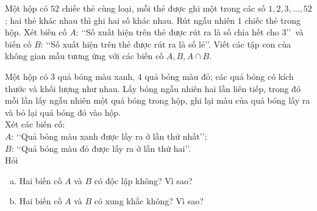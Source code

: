 \begin{bt}%
	Một hộp có $52$ chiếc thẻ cùng loại, mỗi thẻ được ghi một trong các số $1,2,3, \ldots, 52$; hai thẻ khác nhau thì ghi hai số khác nhau. Rút ngẫu nhiên $1$ chiếc thẻ trong hộp. Xét biến cố $A$: \lq\lq Số xuất hiện trên thẻ được rút ra là số chia hết cho 3\rq\rq \, và biến cố $B$: \lq\lq Số xuất hiện trên thẻ được rút ra là số lẻ\rq\rq. Viết các tập con của không gian mẫu tương ứng với các biến cố $A, B, A \cap B$.
\end{bt}

\begin{bt}%
	Một hộp có $3$ quả bóng màu xanh, $4$ quả bóng màu đỏ; các quả bóng có kích thước và khối lượng như nhau. Lấy bóng ngẫu nhiên hai lần liên tiếp, trong đó mỗi lần lấy ngẫu nhiên một quả bóng trong hộp, ghi lại màu của quả bóng lấy ra và bỏ lại quả bóng đó vào hộp.\\
	Xét các biến cố:\\
	$A$: \lq\lq Quả bóng màu xanh được lấy ra ở lần thứ nhất\rq\rq;\\
	$B$: \lq\lq Quả bóng màu đỏ được lấy ra ở lần thứ hai\rq\rq.\\
	Hỏi
	\begin{enumerate}[a)]
		\item Hai biến cố $A$ và $B$ có độc lập không? Vì sao?
		\item Hai biến cố $A$ và $B$ có xung khắc không? Vì sao?
	\end{enumerate}
\end{bt}

